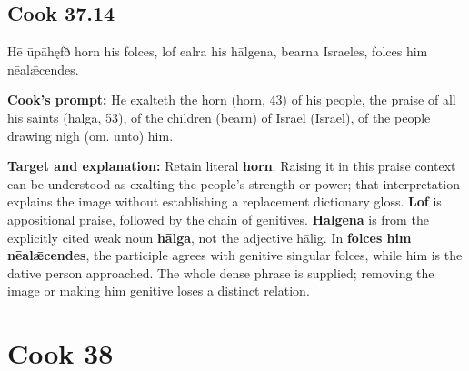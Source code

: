 \par\begin{minipage}{\linewidth}\raggedright
\subsection*{Cook 37.14}

Hē ūpāhęfð horn his folces, lof ealra his hālgena, bearna Israeles, folces him nēalǣcendes.

\textbf{Cook's prompt:} He exalteth the horn (horn, 43) of his people, the praise of all his saints (hālga, 53), of the children (bearn) of Israel (Israel), of the people drawing nigh (om. unto) him.

\textbf{Target and explanation:} Retain literal \textbf{horn}. Raising it in this praise context can be understood as exalting the people's strength or power; that interpretation explains the image without establishing a replacement dictionary gloss. \textbf{Lof} is appositional praise, followed by the chain of genitives. \textbf{Hālgena} is from the explicitly cited weak noun \textbf{hālga}, not the adjective hālig. In \textbf{folces him nēalǣcendes}, the participle agrees with genitive singular folces, while him is the dative person approached. The whole dense phrase is supplied; removing the image or making him genitive loses a distinct relation.

\end{minipage}\par\addvspace{4pt}

\clearpage
\section*{Cook 38}

